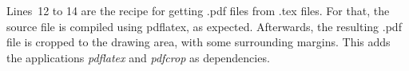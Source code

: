 Lines~12 to 14 are the recipe for getting \mbox{.pdf} files from \mbox{.tex}
files.
For that, the source file is compiled using pdflatex, as expected.
Afterwards, the resulting \mbox{.pdf} file is cropped to the drawing area, with
some surrounding margins.
This adds the applications \emph{pdflatex} and \emph{pdfcrop} as dependencies.
